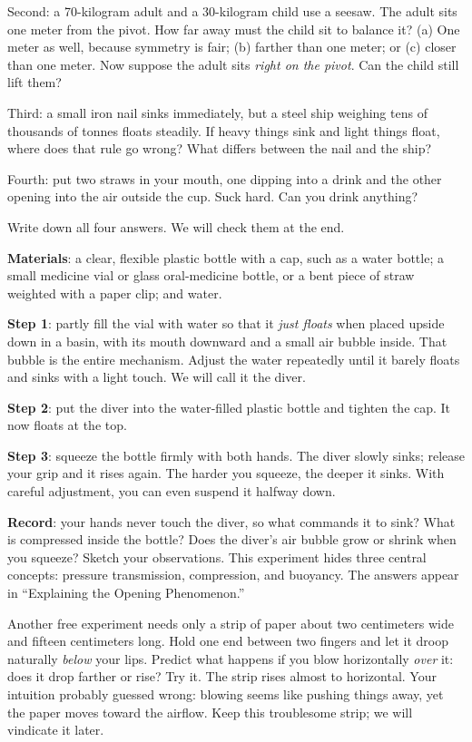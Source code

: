 Second: a 70-kilogram adult and a 30-kilogram child use a seesaw. The adult sits one meter from the pivot. How far away must the child sit to balance it? (a) One meter as well, because symmetry is fair; (b) farther than one meter; or (c) closer than one meter. Now suppose the adult sits \emph{right on the pivot}. Can the child still lift them?

Third: a small iron nail sinks immediately, but a steel ship weighing tens of thousands of tonnes floats steadily. If heavy things sink and light things float, where does that rule go wrong? What differs between the nail and the ship?

Fourth: put two straws in your mouth, one dipping into a drink and the other opening into the air outside the cup. Suck hard. Can you drink anything?

Write down all four answers. We will check them at the end.


\begin{experiment}
\textbf{Materials}: a clear, flexible plastic bottle with a cap, such as a water bottle; a small medicine vial or glass oral-medicine bottle, or a bent piece of straw weighted with a paper clip; and water.

\textbf{Step 1}: partly fill the vial with water so that it \emph{just floats} when placed upside down in a basin, with its mouth downward and a small air bubble inside. That bubble is the entire mechanism. Adjust the water repeatedly until it barely floats and sinks with a light touch. We will call it the diver.

\textbf{Step 2}: put the diver into the water-filled plastic bottle and tighten the cap. It now floats at the top.

\textbf{Step 3}: squeeze the bottle firmly with both hands. The diver slowly sinks; release your grip and it rises again. The harder you squeeze, the deeper it sinks. With careful adjustment, you can even suspend it halfway down.

\textbf{Record}: your hands never touch the diver, so what commands it to sink? What is compressed inside the bottle? Does the diver's air bubble grow or shrink when you squeeze? Sketch your observations. This experiment hides three central concepts: pressure transmission, compression, and buoyancy. The answers appear in ``Explaining the Opening Phenomenon.''
\end{experiment}

Another free experiment needs only a strip of paper about two centimeters wide and fifteen centimeters long. Hold one end between two fingers and let it droop naturally \emph{below} your lips. Predict what happens if you blow horizontally \emph{over} it: does it drop farther or rise? Try it. The strip rises almost to horizontal. Your intuition probably guessed wrong: blowing seems like pushing things away, yet the paper moves toward the airflow. Keep this troublesome strip; we will vindicate it later.

